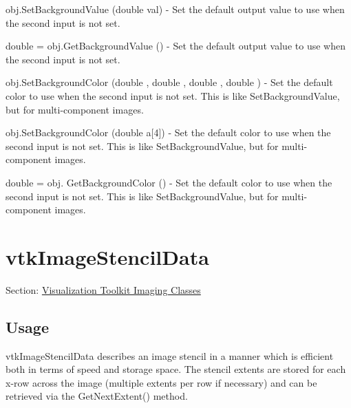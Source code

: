 \begin{DoxyItemize}
\item {\ttfamily obj.\-Set\-Background\-Value (double val)} -\/ Set the default output value to use when the second input is not set.  
\item {\ttfamily double = obj.\-Get\-Background\-Value ()} -\/ Set the default output value to use when the second input is not set.  
\item {\ttfamily obj.\-Set\-Background\-Color (double , double , double , double )} -\/ Set the default color to use when the second input is not set. This is like Set\-Background\-Value, but for multi-\/component images.  
\item {\ttfamily obj.\-Set\-Background\-Color (double a\mbox{[}4\mbox{]})} -\/ Set the default color to use when the second input is not set. This is like Set\-Background\-Value, but for multi-\/component images.  
\item {\ttfamily double = obj. Get\-Background\-Color ()} -\/ Set the default color to use when the second input is not set. This is like Set\-Background\-Value, but for multi-\/component images.  
\end{DoxyItemize}\hypertarget{vtkimaging_vtkimagestencildata}{}\section{vtk\-Image\-Stencil\-Data}\label{vtkimaging_vtkimagestencildata}
Section\-: \hyperlink{sec_vtkimaging}{Visualization Toolkit Imaging Classes} \hypertarget{vtkwidgets_vtkxyplotwidget_Usage}{}\subsection{Usage}\label{vtkwidgets_vtkxyplotwidget_Usage}
vtk\-Image\-Stencil\-Data describes an image stencil in a manner which is efficient both in terms of speed and storage space. The stencil extents are stored for each x-\/row across the image (multiple extents per row if necessary) and can be retrieved via the Get\-Next\-Extent() method.

